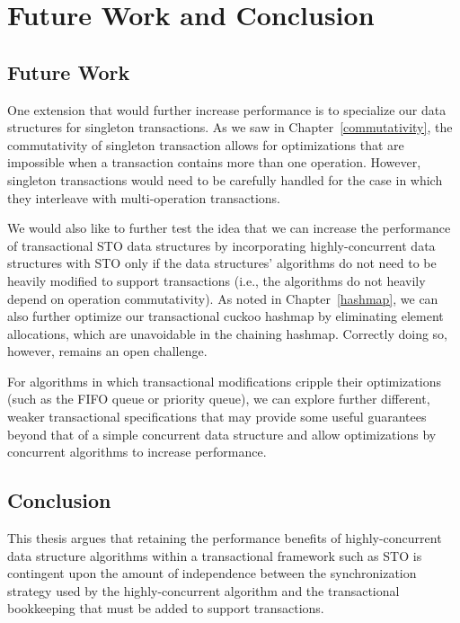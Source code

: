 \chapter{Future Work and Conclusion}

\section{Future Work}
One extension that would further increase performance is to specialize our data structures for singleton transactions. As we saw in Chapter~\ref{commutativity}, the commutativity of singleton transaction allows for optimizations that are impossible when a transaction contains more than one operation. However, singleton transactions would need to be carefully handled for the case in which they interleave with multi-operation transactions. 

We would also like to further test the idea that we can increase the performance of transactional STO data structures by incorporating highly-concurrent data structures with STO only if the data structures' algorithms do not need to be heavily modified to support transactions (i.e., the algorithms do not heavily depend on operation commutativity).
As noted in Chapter~\ref{hashmap}, we can also further optimize our transactional cuckoo hashmap by eliminating element allocations, which are unavoidable in the chaining hashmap. Correctly doing so, however, remains an open challenge.

For algorithms in which transactional modifications cripple their optimizations (such as the FIFO queue or priority queue), we can explore further different, weaker transactional specifications that may provide some useful guarantees beyond that of a simple concurrent data structure and allow optimizations by concurrent algorithms to increase performance.

\section{Conclusion}
This thesis argues that retaining the performance benefits of highly-concurrent data structure algorithms within a transactional framework such as STO is contingent upon the amount of independence between the synchronization strategy used by the highly-concurrent algorithm and the transactional bookkeeping that must be added to support transactions.

